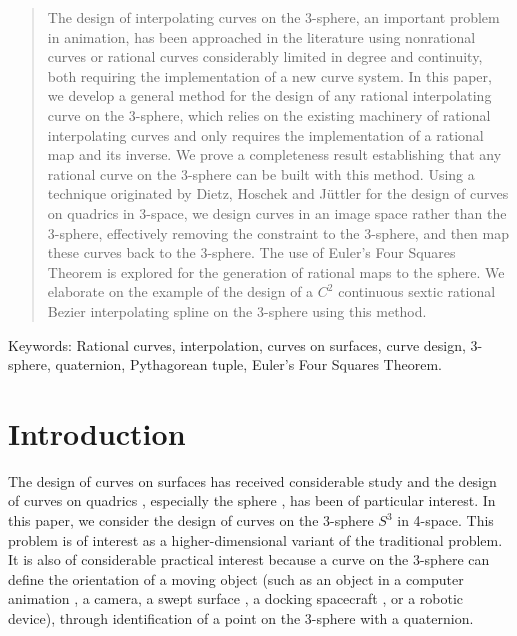 \begin{abstract}
The design of interpolating curves on the 3-sphere, an important problem
in animation, has been approached in the literature using nonrational
curves or rational curves considerably limited in degree and continuity,
both requiring the implementation of a new curve system.
In this paper, we develop a general method for the design of any rational
interpolating curve on the 3-sphere,
which relies on the existing machinery of rational interpolating curves 
and only requires the implementation of a rational map and its inverse.
We prove a completeness result establishing that any rational curve on the
3-sphere can be built with this method.
Using a technique originated by Dietz, Hoschek and J\"{u}ttler for the design
of curves on quadrics in 3-space, we design curves in an image space rather than
the 3-sphere, effectively removing the constraint to the 3-sphere, and
then map these curves back to the 3-sphere.
The use of Euler's Four Squares Theorem is explored for the generation
of rational maps to the sphere.
We elaborate on the example of the design of a $C^2$ continuous sextic rational
Bezier interpolating spline on the 3-sphere using this method.
\end{abstract}

Keywords: Rational curves, interpolation, curves on surfaces, curve design,
	  3-sphere, quaternion, Pythagorean tuple, Euler's Four Squares Theorem.

\section{Introduction}

The design of curves on surfaces has received considerable study
and the design of curves on quadrics \cite{boehmHansford91,dietz93}, 
especially the sphere \cite{hoschekSeemann92}, has been of particular interest.
In this paper, we consider the design of curves on the 3-sphere $S^3$ in 4-space.
This problem is of interest as a higher-dimensional variant of the traditional
problem.  
It is also of considerable practical interest because
a curve on the 3-sphere can define the orientation of a moving object
(such as an object in a computer animation \cite{shoemake85}, a camera, 
a swept surface \cite{jjjw95b}, a docking spacecraft \cite{junkins86}, 
or a robotic device),
through identification of a point on the 3-sphere with a quaternion.

